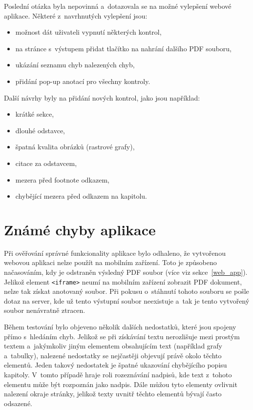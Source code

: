 Poslední otázka byla nepovinná a~dotazovala se na možné vylepšení webové
aplikace. Některé z~navrhnutých vylepšení jsou:
\begin{itemize}
    \item možnost dát uživateli vypnutí některých kontrol,
    \item na stránce s~výstupem přidat tlačítko na nahrání dalšího PDF souboru,
    \item ukázání seznamu chyb nalezených chyb,
    \item přidání pop-up anotací pro všechny kontroly.
\end{itemize}
Další návrhy byly na přidání nových kontrol, jako jsou například:
\begin{itemize}
    \item krátké sekce,
    \item dlouhé odstavce,
    \item špatná kvalita obrázků (rastrové grafy),
    \item citace za odstavcem,
    \item mezera před footnote odkazem,
    \item chybějící mezera před odkazem na kapitolu.
\end{itemize}



\section{Známé chyby aplikace} \label{app_errors}
Při ověřování správné funkcionality aplikace bylo odhaleno, že vytvořenou webovou aplikaci
nelze použít na mobilním zařízení. Toto je způsobeno načasováním, kdy je odstraněn
výsledný PDF soubor (více viz sekce~\ref{web_app}). Jelikož element
\texttt{<iframe>} neumí na mobilním zařízení zobrazit PDF dokument, nelze tak
získat anotovaný soubor. Při pokusu o~stáhnutí tohoto souboru se pošle dotaz
na server, kde už tento výstupní soubor neexistuje a~tak je tento vytvořený soubor
nenávratně ztracen.

Během testování bylo objeveno několik dalších nedostatků, které jsou spojeny přímo
s~hledáním chyb. Jelikož se při získávání textu nerozlišuje mezi prostým textem
a~jakýmkoliv jiným elementem obsahujícím text (například grafy a~tabulky),
nalezené nedostatky se nejčastěji objevují právě okolo těchto elementů. 
Jeden takový nedostatek je špatné ukazování chybějícího popisu kapitoly.
V~tomto případě hraje roli rozeznávání nadpisů, kde text z~tohoto elementu
může být rozpoznán jako nadpis. Dále můžou tyto elementy ovlivnit nalezení
okraje stránky, jelikož texty uvnitř těchto elementů bývají často odsazené.

